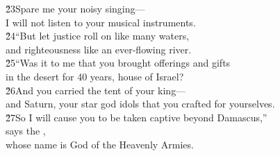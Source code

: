 \begin{poetry}
\poeml \v{23}Spare me your noisy singing--- \\
\poemll    I will not listen to your musical instruments. \\
\poeml \v{24}``But let justice roll on like many waters, \\
\poemll    and righteousness like an ever-flowing river. \\
\poeml \v{25}``Was it to me that you brought offerings and gifts \\
\poemll    in the desert for 40 years, house of Israel? \\
\poeml \v{26}And you carried the tent of your king--- \\
\poemll    and Saturn, your star god idols that you crafted for yourselves. \\
\poeml \v{27}So I will cause you to be taken captive beyond Damascus,'' \\
\poemll    says the , \\
\poemlll       whose name is God of the Heavenly Armies.
\end{poetry}

